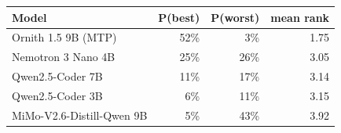 \begin{tabular}{lrrr}\toprule Model & P(best) & P(worst) & mean rank\\\midrule
Ornith 1.5 9B (MTP) & 52\% & 3\% & 1.75 \\
Nemotron 3 Nano 4B & 25\% & 26\% & 3.05 \\
Qwen2.5-Coder 7B & 11\% & 17\% & 3.14 \\
Qwen2.5-Coder 3B & 6\% & 11\% & 3.15 \\
MiMo-V2.6-Distill-Qwen 9B & 5\% & 43\% & 3.92 \\
\bottomrule\end{tabular}
